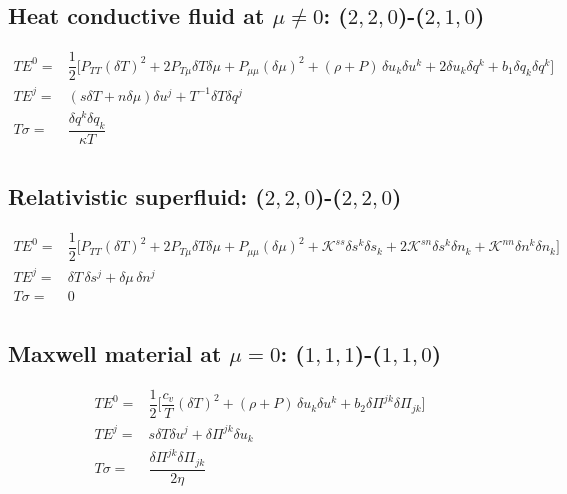 \documentclass[aps,prl,singlecolumn,nofootinbib]{revtex4-2}
\theoremstyle{definition}
\theoremstyle{theorem}
\begin{document}
\subsection*{Heat conductive fluid at $\mu \neq 0$: ($2,2,0$)-($2, 1,0$)}

\begin{equation}
\begin{split}
TE^0 ={}& \dfrac{1}{2} \bigg[ P_{TT} (\delta T)^2 +2 P_{T\mu} \delta T \delta \mu + P_{\mu \mu} (\delta \mu)^2 + (\rho {+} P)\, \delta u_{k} \delta  u^k + 2\delta u_k \delta q^k + b_1 \delta q_k \delta q^k \bigg]  \\
TE^j ={}&  (s \delta T +n \delta \mu) \delta u^j + T^{-1}\delta T \delta q^j \\
T\sigma ={}&  \dfrac{\delta q^k \delta q_k}{\kappa T} \\
\end{split}
\end{equation}

\subsection*{Relativistic superfluid: ($2,2,0$)-($2, 2,0$)}

\begin{equation}
\begin{split}
TE^0 ={}& \dfrac{1}{2} \bigg[ P_{TT} (\delta T)^2 +2 P_{T\mu} \delta T \delta \mu + P_{\mu \mu} (\delta \mu)^2 + \mathcal{K}^{ss} \delta s^k \delta s_{k} + 2\mathcal{K}^{sn} \delta s^k \delta n_{k} + \mathcal{K}^{nn} \delta n^k \delta n_{k} \bigg] \\
TE^j ={}&  \delta T \, \delta s^j + \delta \mu \, \delta n^j  \\
T\sigma ={}&0\\
\end{split}
\end{equation}

\subsection*{Maxwell material at $\mu=0$: ($1,1,1$)-($1, 1,0$)}

\begin{equation}
\begin{split}
TE^0 ={}& \dfrac{1}{2} \bigg[  \dfrac{c_v}{T} (\delta T)^2+ (\rho {+} P)\, \delta u_{k} \delta  u^k + b_2 \delta \Pi^{jk} \delta \Pi_{jk} \bigg] \\
TE^j ={}& s \delta T \delta u^j + \delta \Pi^{jk} \delta u_k \\
T\sigma ={}& \dfrac{\delta \Pi^{jk} \delta \Pi_{jk}}{2\eta} \\
\end{split}
\end{equation}
\end{document}
